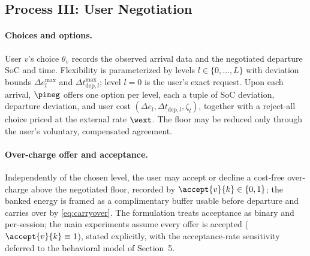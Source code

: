 \subsection{Process III: User Negotiation}\label{sec:negotiation}

\paragraph{Choices and options.} User $v$'s choice $\theta_v$ records
the observed arrival data and the negotiated departure SoC and time.
Flexibility is parameterized by levels $l \in \{0, \ldots, L\}$ with
deviation bounds $\Delta e^{\max}_l$ and $\Delta t^{\max}_{\mathrm{dep},l}$;
level $l = 0$ is the user's exact request. Upon each arrival, $\pineg$
offers one option per level, each a tuple of SoC deviation, departure
deviation, and user cost $(\Delta e_l, \Delta t_{\mathrm{dep},l},
\zeta_l)$, together with a reject-all choice priced at the external rate
$\wext$. The floor may be reduced only through the user's voluntary,
compensated agreement.

\paragraph{Over-charge offer and acceptance.} Independently of the
chosen level, the user may accept or decline a cost-free over-charge
above the negotiated floor, recorded by $\accept{v}{k} \in \{0,1\}$; the
banked energy is framed as a complimentary buffer usable before departure and carries
over by \eqref{eq:carryover}. The formulation treats acceptance as
binary and per-session; the main experiments assume every offer is
accepted ($\accept{v}{k} \equiv 1$), stated explicitly, with the
acceptance-rate sensitivity deferred to the behavioral model of
Section~5.

